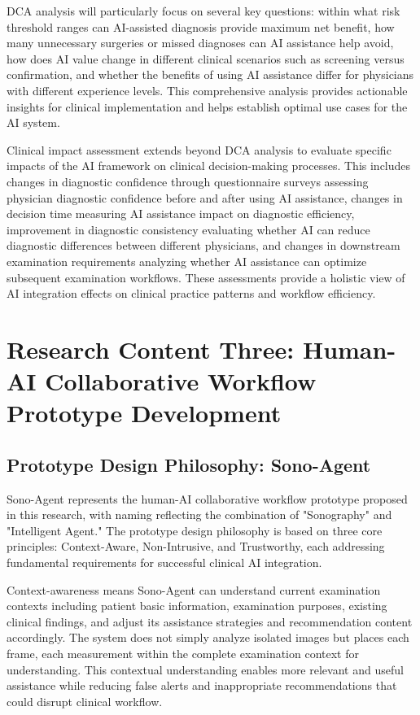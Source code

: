 DCA analysis will particularly focus on several key questions: within what risk threshold ranges can AI-assisted diagnosis provide maximum net benefit, how many unnecessary surgeries or missed diagnoses can AI assistance help avoid, how does AI value change in different clinical scenarios such as screening versus confirmation, and whether the benefits of using AI assistance differ for physicians with different experience levels. This comprehensive analysis provides actionable insights for clinical implementation and helps establish optimal use cases for the AI system.

Clinical impact assessment extends beyond DCA analysis to evaluate specific impacts of the AI framework on clinical decision-making processes. This includes changes in diagnostic confidence through questionnaire surveys assessing physician diagnostic confidence before and after using AI assistance, changes in decision time measuring AI assistance impact on diagnostic efficiency, improvement in diagnostic consistency evaluating whether AI can reduce diagnostic differences between different physicians, and changes in downstream examination requirements analyzing whether AI assistance can optimize subsequent examination workflows. These assessments provide a holistic view of AI integration effects on clinical practice patterns and workflow efficiency.

\section{Research Content Three: Human-AI Collaborative Workflow Prototype Development}

\subsection{Prototype Design Philosophy: Sono-Agent}

Sono-Agent represents the human-AI collaborative workflow prototype proposed in this research, with naming reflecting the combination of "Sonography" and "Intelligent Agent." The prototype design philosophy is based on three core principles: Context-Aware, Non-Intrusive, and Trustworthy, each addressing fundamental requirements for successful clinical AI integration.

Context-awareness means Sono-Agent can understand current examination contexts including patient basic information, examination purposes, existing clinical findings, and adjust its assistance strategies and recommendation content accordingly. The system does not simply analyze isolated images but places each frame, each measurement within the complete examination context for understanding. This contextual understanding enables more relevant and useful assistance while reducing false alerts and inappropriate recommendations that could disrupt clinical workflow.

